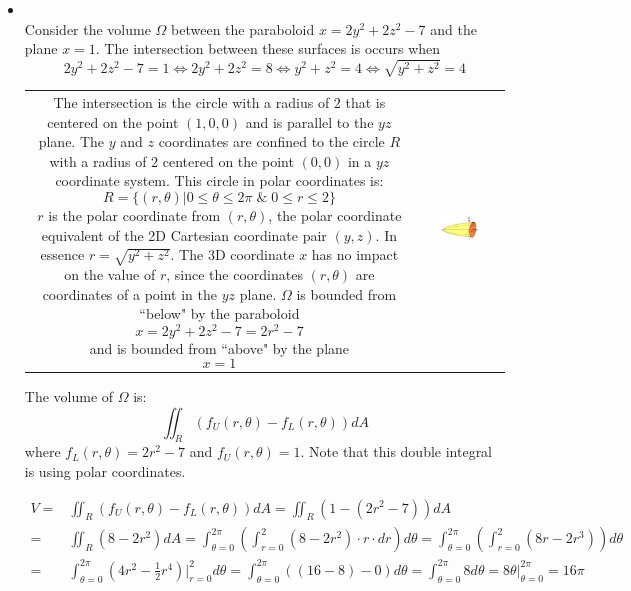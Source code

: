 \documentclass{article}
\begin{document}
\begin{itemize}
\item ~~\\ 
Consider the volume \(\Omega\) between the paraboloid \(x = 2y^2 + 2z^2 - 7\) and the plane \(x = 1\). The intersection between these surfaces is occurs when
\[2y^2 + 2z^2 - 7 = 1 \iff 2y^2 + 2z^2 = 8 \iff y^2 + z^2 = 4 \iff \sqrt{y^2 + z^2} = 4\]

\begin{tabular}{cc} 
\parbox{0.5\textwidth}{
The intersection is the circle with a radius of \(2\) that is centered on the point \((1, 0, 0)\) and is parallel to the \(yz\) plane. 
The \(y\) and \(z\) coordinates are confined to the circle \(R\) with a radius of \(2\) centered on the point \((0,0)\) in a \(yz\) coordinate system. This circle in polar coordinates is:
\[R = \{(r,\theta) | 0 \leq \theta \leq 2\pi \;\&\; 0 \leq r \leq 2\}\]
\(r\) is the polar coordinate from \((r, \theta)\), the polar coordinate equivalent of the 2D Cartesian coordinate pair \((y,z)\). In essence \(r = \sqrt{y^2 + z^2}\). The 3D coordinate \(x\) has no impact on the value of \(r\), since the coordinates \((r, \theta)\) are coordinates of a point in the \(yz\) plane. 
\(\Omega\) is bounded from ``below" by the paraboloid 
\[x = 2y^2 + 2z^2 - 7 = 2r^2 - 7\]
and is bounded from ``above" by the plane 
\[x = 1\]
} & \parbox{0.5\textwidth}{
\includegraphics[width = 0.5\textwidth]{volume_example_2}
}
\end{tabular}

The volume of \(\Omega\) is: 
\[\iint_R (f_U(r,\theta) - f_L(r,\theta))dA\]
where \(f_L(r,\theta) = 2r^2 - 7\) and \(f_U(r,\theta) = 1\). Note that this double integral is using polar coordinates.

\begin{align*}
V = & \iint_R (f_U(r,\theta) - f_L(r,\theta))dA 
= \iint_R (1 - (2r^2 - 7))dA \\ 
= & \iint_R (8 - 2r^2)dA   
= \int_{\theta = 0}^{2\pi} \left(\int_{r = 0}^2 (8 - 2r^2) \cdot r \cdot dr \right)d\theta 
= \int_{\theta = 0}^{2\pi} \left(\int_{r = 0}^2 (8r - 2r^3) \right)d\theta \\
= & \int_{\theta = 0}^{2\pi} (4r^2 - \frac{1}{2}r^4)\Big|_{r = 0}^2 d\theta  
= \int_{\theta = 0}^{2\pi} ((16 - 8) - 0) d\theta 
= \int_{\theta = 0}^{2\pi} 8 d\theta   
= 8\theta\bigg|_{\theta = 0}^{2\pi} 
= 16\pi
\end{align*}

\end{itemize}
\end{document}

